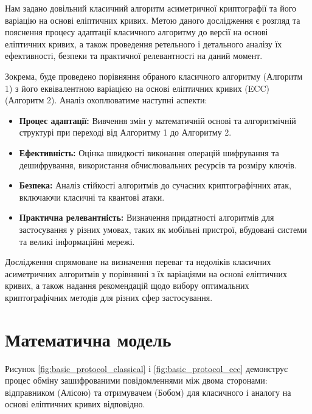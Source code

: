 \documentclass[12pt]{report}
\theoremstyle{definition}
\theoremstyle{plain}
\begin{document}
Нам задано довільний класичний алгоритм асиметричної криптографії та його варіацію на основі еліптичних кривих. Метою даного дослідження є розгляд та пояснення процесу адаптації класичного алгоритму до версії на основі еліптичних кривих, а також проведення ретельного і детального аналізу їх ефективності, безпеки та практичної релевантності на даний момент.

Зокрема, буде проведено порівняння обраного класичного алгоритму (Алгоритм 1) з його еквівалентною варіацією на основі еліптичних кривих (ECC) (Алгоритм 2). Аналіз охоплюватиме наступні аспекти:
\begin{itemize}
    \item \textbf{Процес адаптації:} Вивчення змін у математичній основі та алгоритмічній структурі при переході від Алгоритму 1 до Алгоритму 2.
    \item \textbf{Ефективність:} Оцінка швидкості виконання операцій шифрування та дешифрування, використання обчислювальних ресурсів та розміру ключів.
    \item \textbf{Безпека:} Аналіз стійкості алгоритмів до сучасних криптографічних атак, включаючи класичні та квантові атаки.
    \item \textbf{Практична релевантність:} Визначення придатності алгоритмів для застосування у різних умовах, таких як мобільні пристрої, вбудовані системи та великі інформаційні мережі.
\end{itemize}

Дослідження спрямоване на визначення переваг та недоліків класичних асиметричних алгоритмів у порівнянні з їх варіаціями на основі еліптичних кривих, а також надання рекомендацій щодо вибору оптимальних криптографічних методів для різних сфер застосування.

\section{Математична модель}

Рисунок \ref{fig:basic_protocol_classical} і \ref{fig:basic_protocol_ecc} демонструє процес обміну зашифрованими повідомленнями між двома сторонами: відправником (Алісою) та отримувачем (Бобом) для класичного і аналогу на основі еліптичних кривих відповідно.
\end{document}
